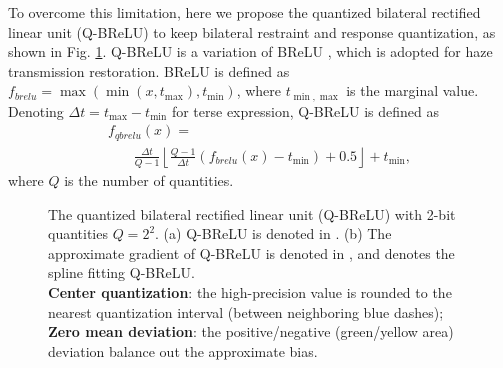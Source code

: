 \documentclass[runningheads]{llncs}
\begin{document}
To overcome this limitation, here we propose the quantized bilateral rectified linear unit (Q-BReLU) to keep bilateral restraint and response quantization, as shown in Fig. \ref{fig:qbrelu}. Q-BReLU is a variation of BReLU \cite{dehazenet}, which is adopted for haze transmission restoration. BReLU is defined as ${f_{brelu}} = \max \left( {\min \left( {x,{t_{\max }}} \right),{t_{\min }}} \right)$, where $t_{\min,\max}$ is the marginal value. Denoting $\Delta t=t_{\max}-t_{\min}$ for terse expression, Q-BReLU is defined as
\begin{equation}\label{qbrelu}
\begin{array}{l}
{f_{qbrelu}}\left( x \right) = \\
\quad \;\;\;\frac{{\Delta t}}{{Q - 1}}\left\lfloor {\frac{{Q - 1}}{{\Delta t}}\left( {{f_{brelu}}\left( x \right) - {t_{\min }}} \right) + 0.5} \right\rfloor  + {t_{\min }},
\end{array}
\end{equation}
where $Q$ is the number of quantities.
\begin{figure}[th]
\begin{center}
\end{center}
   \caption{The quantized bilateral rectified linear unit (Q-BReLU) with 2-bit quantities $Q=2^{2}$. (a) Q-BReLU is denoted in \emph{\textbf{\color{blue}{solid blue}}}. (b) The approximate gradient of Q-BReLU is denoted in \emph{\textbf{\color{red}{dashed red}}}, and \emph{\textbf{\color{red}{solid red}}} denotes the spline fitting Q-BReLU.\protect\\ \textbf{Center quantization}: the high-precision value is rounded to the nearest quantization interval (between neighboring blue dashes); \textbf{Zero mean deviation}: the positive/negative (green/yellow area) deviation balance out the approximate bias.}
\label{fig:qbrelu}
\end{figure}
\end{document}

